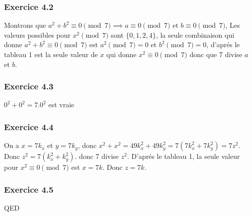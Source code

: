 \documentclass[]{book}
\theoremstyle{definition}
\begin{document}
\subsubsection*{Exercice 4.2}
Montrons que  $a^2 + b^2  \equiv 0 \pmod{7} \implies a \equiv 0 \pmod{7} \text{ et } b \equiv 0 \pmod{7}$, Les valeurs possibles pour $x^2 \pmod{7}$ sont $\{0,1,2,4\}$, la seule combinaison qui donne $a^2 + b^2 \equiv 0 \pmod{7}$ est $a^2 \pmod{7} = 0$ et $b^2 \pmod{7} = 0$, d'apr\'es le tableau 1 est la seule valeur de $x$ qui donne $x^2 \equiv 0 \pmod{7}$ donc que 7 divise $a$ et $b$.

\subsubsection*{Exercice 4.3}
$0^2 + 0^2 = 7.0^2$ est vraie

\subsubsection*{Exercice 4.4}
On a $x = 7k_x$ et $y=7k_y$, donc $x^2 + x^2 = 49k_x^2 + 49k_y^2 = 7(7k_x^2+7k_y^2) = 7z^2$. Donc $z^2 = 7(k_x^2 + k_y^2)$. donc 7 divise $z^2$. D'apr\'es le tableau 1, la seule valeur pour $x^2 \equiv 0 \pmod{7}$ est $x=7k$. Donc $z = 7k$.

\subsubsection*{Exercice 4.5}


QED
\end{document}
